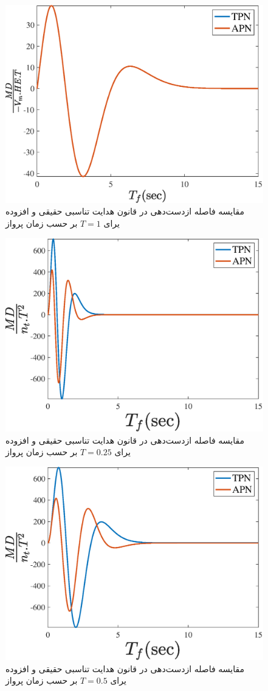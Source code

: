 \begin{figure}[H]
	\centering
	\includegraphics[width=.75\linewidth]{../Figure/Q2/c/HE_1}
	\caption{مقایسه فاصله ازدست‌دهی در قانون هدایت تناسبی حقیقی و افزوده یرای $T=1$ بر حسب زمان پرواز}
\end{figure}

\begin{figure}[H]
	\centering
	\includegraphics[width=.75\linewidth]{../Figure/Q2/c/n_t_25}
	\caption{مقایسه فاصله ازدست‌دهی در قانون هدایت تناسبی حقیقی و افزوده یرای $T=0.25$ بر حسب زمان پرواز}
\end{figure}

\begin{figure}[H]
	\centering
	\includegraphics[width=.75\linewidth]{../Figure/Q2/c/n_t_5}
	\caption{مقایسه فاصله ازدست‌دهی در قانون هدایت تناسبی حقیقی و افزوده یرای $T=0.5$ بر حسب زمان پرواز}
\end{figure}

